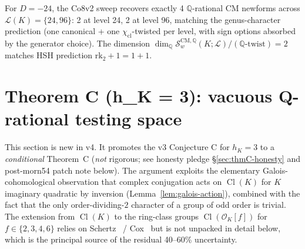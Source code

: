 \documentclass[11pt,a4paper]{amsart}
\theoremstyle{definition}
\DeclareMathOperator{\Cl}{Cl}
\newcommand{\Q}{\mathbb{Q}}
\newcommand{\OK}{\mathcal{O}_K}
\newcommand{\Lcal}{\mathcal{L}}
\newcommand{\Scal}{\mathcal{S}}
\newcommand{\hK}{h_{K}}
\newcommand{\rktwo}{\mathrm{rk}_2}
\begin{document}
For $D = -24$, the Co8v2 sweep recovers exactly 4 $\Q$-rational CM newforms across $\Lcal(K) = \{24, 96\}$: 2 at level 24, 2 at level 96, matching the genus-character prediction (one canonical + one $\chi_{\mathrm{cl}}$-twisted per level, with sign options absorbed by the generator choice). The dimension $\dim_\Q \Scal_w^{\mathrm{CM}, \Q}(K; \Lcal) / (\Q\text{-twist})= 2$ matches HSH prediction $\rktwo + 1 = 1 + 1$.


\section{Theorem C (h\_K = 3): vacuous Q-rational testing space}\label{sec:theoremC}

This section is new in v4. It promotes the v3 Conjecture C for $\hK = 3$ to a \emph{conditional} Theorem~C (\emph{not} rigorous; see honesty pledge \S\ref{sec:thmC-honesty} and post-morn54 patch note below). The argument exploits the elementary Galois-cohomological observation that complex conjugation acts on $\Cl(K)$ for $K$ imaginary quadratic by inversion (Lemma~\ref{lem:galois-action}), combined with the fact that the only order-dividing-$2$ character of a group of odd order is trivial. The extension from $\Cl(K)$ to the ring-class groups $\Cl(\OK[f])$ for $f \in \{2, 3, 4, 6\}$ relies on Schertz~\cite[Ch.~6]{Schertz2010} / Cox~\cite[Ch.~9]{Cox2013} but is not unpacked in detail below, which is the principal source of the residual 40--60\% uncertainty.
\end{document}
